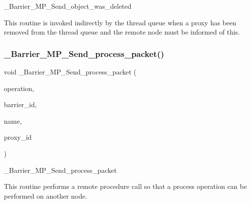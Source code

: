 \+\_\+\+Barrier\+\_\+\+M\+P\+\_\+\+Send\+\_\+object\+\_\+was\+\_\+deleted 

This routine is invoked indirectly by the thread queue when a proxy has been removed from the thread queue and the remote node must be informed of this. \mbox{\label{group__ClassicBarrierMP_ga1bf88d4bcfbe673860d2c0c3f565271e}} 
\subsubsection{\texorpdfstring{\_Barrier\_MP\_Send\_process\_packet()}{\_Barrier\_MP\_Send\_process\_packet()}}
{\footnotesize\ttfamily void \+\_\+\+Barrier\+\_\+\+M\+P\+\_\+\+Send\+\_\+process\+\_\+packet (\begin{DoxyParamCaption}\item[{\mbox{\hyperlink{group__ClassicBarrierMP_ga14a42806fd76d110a17d806124a892d0}{Barrier\+\_\+\+M\+P\+\_\+\+Remote\+\_\+operations}}}]{operation,  }\item[{\mbox{\hyperlink{group__RTEMSScoreObject_ga5821f52a51072941bdd603e542d0863e}{Objects\+\_\+\+Id}}}]{barrier\+\_\+id,  }\item[{\mbox{\hyperlink{group__ClassicTasks_ga55fb63c49f68c0cbd9bee004da15b1fd}{rtems\+\_\+name}}}]{name,  }\item[{\mbox{\hyperlink{group__RTEMSScoreObject_ga5821f52a51072941bdd603e542d0863e}{Objects\+\_\+\+Id}}}]{proxy\+\_\+id }\end{DoxyParamCaption})}



\+\_\+\+Barrier\+\_\+\+M\+P\+\_\+\+Send\+\_\+process\+\_\+packet 

This routine performs a remote procedure call so that a process operation can be performed on another node. \mbox{\label{group__ClassicBarrierMP_ga7aa5d74ce738310ef9ff89448117235a}} 
